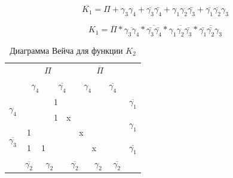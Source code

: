 \documentclass[a4paper,14pt]{article}
\begin{document}
$$\overline{K_1} = \Pi + \gamma_3 \gamma_4 + \bar{\gamma_3} \bar{\gamma_4} + \gamma_1 \gamma_2 \bar{\gamma_3} + \bar{\gamma_1} \bar{\gamma_2} \gamma_3$$

$$K_1 = \overline{\Pi} * \overline{\gamma_3 \gamma_4} * \overline{\bar{\gamma_3} \bar{\gamma_4}} * \overline{\gamma_1 \gamma_2 \bar{\gamma_3}} * \overline{\bar{\gamma_1} \bar{\gamma_2} \gamma_3}$$





\begin{table}[H]	
	\begin{center}
		\caption{\label{tab:dvKorrK2} Диаграмма Вейча для функции $K_2$}
	\begin{tabular}{cccccccccc}
		& \multicolumn{4}{c}{$\Pi$}                                                                             & \multicolumn{4}{c}{$\overline{\Pi}$}                                                                          &                     \\
		& \multicolumn{2}{c}{$\gamma_4$}                          & \multicolumn{2}{c}{$\overline{\gamma_4}$}                         & \multicolumn{2}{c}{$\gamma_4$}                          & \multicolumn{2}{c}{$\overline{\gamma_4}$}                       &                     \\ \cline{2-9}
		\multicolumn{1}{c|}{\multirow{2}{*}{$\gamma_4$}}  & \multicolumn{1}{c|}{}  & \multicolumn{1}{c|}{}  & \multicolumn{1}{c|}{1} & \multicolumn{1}{c|}{}  & \multicolumn{1}{c|}{}  & \multicolumn{1}{c|}{}  & \multicolumn{1}{c|}{} & \multicolumn{1}{c|}{} & $\overline{\gamma_1}$                 \\ \cline{2-9}
		\multicolumn{1}{c|}{}                     & \multicolumn{1}{c|}{}  & \multicolumn{1}{c|}{}  & \multicolumn{1}{c|}{1} & \multicolumn{1}{c|}{x} & \multicolumn{1}{c|}{}  & \multicolumn{1}{c|}{}  & \multicolumn{1}{c|}{} & \multicolumn{1}{c|}{} & \multirow{2}{*}{$\gamma_1$} \\ \cline{2-9}
		\multicolumn{1}{c|}{\multirow{2}{*}{$\overline{\gamma_3}$}} & \multicolumn{1}{c|}{1} & \multicolumn{1}{c|}{}  & \multicolumn{1}{c|}{}  & \multicolumn{1}{c|}{}  & \multicolumn{1}{c|}{x} & \multicolumn{1}{c|}{}  & \multicolumn{1}{c|}{} & \multicolumn{1}{c|}{} &                     \\ \cline{2-9}
		\multicolumn{1}{c|}{}                     & \multicolumn{1}{c|}{1} & \multicolumn{1}{c|}{1} & \multicolumn{1}{c|}{}  & \multicolumn{1}{c|}{}  & \multicolumn{1}{c|}{}  & \multicolumn{1}{c|}{x} & \multicolumn{1}{c|}{} & \multicolumn{1}{c|}{} & $\overline{\gamma_1}$                \\ \cline{2-9}
		& $\overline{\gamma_2}$                    & \multicolumn{2}{c}{$\gamma_2$}                          & \multicolumn{2}{c}{$\overline{\gamma_2}$}                         & \multicolumn{2}{c}{$\gamma_2$}                         & $\overline{\gamma_2}$                   &                    
	\end{tabular}
\end{center}
\end{table}
\end{document}
